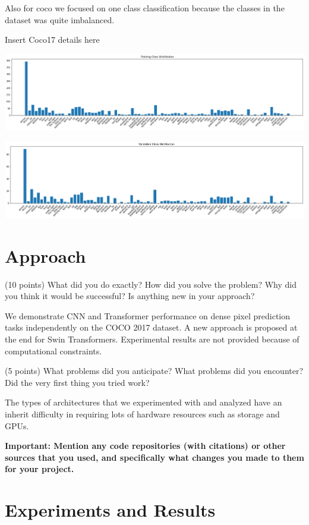 \documentclass[10pt,twocolumn,letterpaper]{article}
\begin{document}
Also for coco we focused on one class classification because the classes in the dataset was quite imbalanced. 

Insert Coco17 details here

\includegraphics[width=0.8\linewidth]{docs/latex/images/coco17_train_trunc.png}
\caption{}

\includegraphics[width=0.8\linewidth]{docs/latex/images/coco17_val_trunc.png}
\caption{}

\section{Approach}

(10 points) What did you do exactly? How did you solve the problem? Why did you think it would be successful? Is anything new in your approach?

We demonstrate CNN and Transformer performance on dense pixel prediction tasks independently on the COCO 2017 dataset. A new approach is proposed at the end for Swin Transformers. Experimental results are not provided because of computational constraints.

(5 points) What problems did you anticipate? What problems did you encounter? Did the very first thing you tried work?

The types of architectures that we experimented with and analyzed have an inherit difficulty in requiring lots of hardware resources such as storage and GPUs.

\textbf{Important: Mention any code repositories (with citations) or other sources that you used, and specifically what changes you made to them for your project. }

\section{Experiments and Results}
\end{document}
